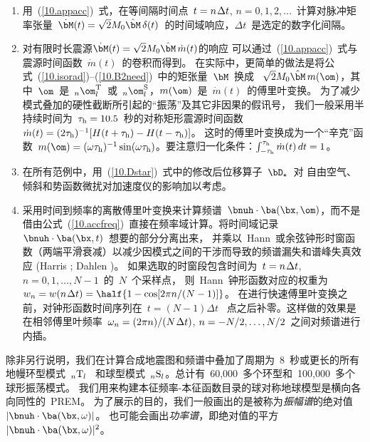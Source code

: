 \begin{enumerate}
\item 用~(\ref{10.appacc})~式，在等间隔时间点~$t=n\hspace{0.3 mm}\Delta t$, $n=0,1,2,\ldots$~计算对脉冲矩率张量~$\dot{\bM}(t)=\sqrt{2}M_0\hat{\bM}\,\delta(t)$~的时间域响应，$\Delta t$~是选定的数字化间隔。

\item 对有限时长震源$\dot{\bM}(t)=\sqrt{2}M_0\hat{\bM}\,\dot{m}(t)$的响应
可以通过~(\ref{10.appacc})~式与震源时间函数~$\dot{m}(t)$~的卷积而得到。
在实际中，更简单的做法是将公式~(\ref{10.isorad})--(\ref{10.B2need})~中的矩张量~$\bM$~换成 ~$\sqrt{2}M_0\hat{\bM}\,m(\om)$，其中~$\om$~是~${}_n\om_l^{\rm T}$~或~${}_n\om_l^{\rm S}$，$m(\om)$~是~$\dot{m}(t)$~的傅里叶变换。
为了减少模式叠加的硬性截断所引起的“振荡”及其它非因果的假讯号，
我们一般采用半持续时间为~$\tau_{\rm h}=10.5$~秒的对称矩形震源时间函数 ~$\dot{m}(t)=(2\tau_{\rm h})^{-1}[H(t+\tau_{\rm h})
-H(t-\tau_{\rm h})]$。
%
这时的傅里叶变换成为一个“辛克”函数~$m(\om)=(\omega\tau_{\rm h})^{-1}\sin(\omega\tau_{\rm h})$。要注意归一化条件：$\int_{-\tau_{\rm h}}^{\tau_{\rm h}}\dot{m}(t)\,dt=1$。

\item  在所有范例中，用~(\ref{10.Dstar})~式中的修改后位移算子~$\bD_{\star}$~对
自由空气、倾斜和势函数微扰对加速度仪的影响加以考虑。

\item 采用时间到频率的离散傅里叶变换来计算频谱~$\bnuh\cdot\ba(\bx,\om)$，而不是借由公式~(\ref{10.accfreq})~直接在频率域计算。将时间域记录~$\bnuh\cdot\ba(\bx,t)$~想要的部分分离出来，
并乘以~Hann~或余弦钟形时窗函数（两端平滑衰减）以减少因模式之间的干涉而导致的频谱漏失和谱峰失真效应 (Harris \citeyear{harris78}; Dahlen \citeyear{dahlen82})。
如果选取的时窗段包含时间为~$t=n\hspace{0.3 mm}\Delta t$, $n=0,1,\ldots,N-1$~的~$N$~个采样点，
则~Hann~钟形函数对应的权重为~$w_n=w(n\hspace{0.3 mm}\Delta t)=
\half\{1-\cos[2\pi n/(N-1)]\}$。
在进行快速傅里叶变换之前，对钟形函数时间序列在~$t=(N-1)\Delta t$ ~点之后补零。这样做的效果是在相邻傅里叶频率~$\omega_n=(2\pi n)/(N\hspace{0.3 mm}\Delta t)$,
$n=-N\hspace{-0.2 mm}/2,\ldots,N\hspace{-0.2 mm}/2$~之间对频谱进行内插。
\end{enumerate}

除非另行说明，我们在计算合成地震图和频谱中叠加了周期为~8~秒或更长的所有地幔环型模式~${}_n{\rm T}_l$
~和球型模式~${}_n{\rm S}_l$。总计有~60,000~多个环型和~100,000~多个球形振荡模式。
我们用来构建本征频率-本征函数目录的球对称地球模型是横向各向同性的~PREM。
为了展示的目的，我们一般画出的是被称为{\em 振幅谱}的绝对值~$|\bnuh\cdot\ba(\bx,\omega)|$。
%
%
也可能会画出{\em 功率谱}，即绝对值的平方~$|\bnuh\cdot\ba(\bx,\omega)|^2$。
%
%

